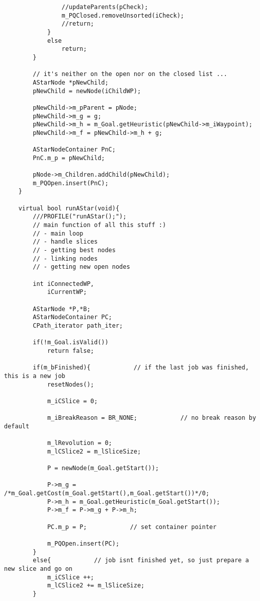\documentclass[12pt]{article}
\begin{document}
\begin{verbatim}
                //updateParents(pCheck);
                m_PQClosed.removeUnsorted(iCheck);
                //return;
            }
            else
                return;
        }
        
        // it's neither on the open nor on the closed list ...
        AStarNode *pNewChild;
        pNewChild = newNode(iChildWP);
        
        pNewChild->m_pParent = pNode;
        pNewChild->m_g = g;
        pNewChild->m_h = m_Goal.getHeuristic(pNewChild->m_iWaypoint);
        pNewChild->m_f = pNewChild->m_h + g;
        
        AStarNodeContainer PnC;
        PnC.m_p = pNewChild;
        
        pNode->m_Children.addChild(pNewChild);
        m_PQOpen.insert(PnC);
    }
    
    virtual bool runAStar(void){
        ///PROFILE("runAStar();");
        // main function of all this stuff :)
        // - main loop
        // - handle slices
        // - getting best nodes
        // - linking nodes
        // - getting new open nodes

        int iConnectedWP,
            iCurrentWP;

        AStarNode *P,*B;
        AStarNodeContainer PC;
        CPath_iterator path_iter;

        if(!m_Goal.isValid())
            return false;
        
        if(m_bFinished){            // if the last job was finished, this is a new job
            resetNodes();

            m_iCSlice = 0;
            
            m_iBreakReason = BR_NONE;            // no break reason by default
            
            m_lRevolution = 0;
            m_lCSlice2 = m_lSliceSize;
            
            P = newNode(m_Goal.getStart());
            
            P->m_g = /*m_Goal.getCost(m_Goal.getStart(),m_Goal.getStart())*/0;
            P->m_h = m_Goal.getHeuristic(m_Goal.getStart());
            P->m_f = P->m_g + P->m_h;

            PC.m_p = P;            // set container pointer
            
            m_PQOpen.insert(PC);
        }
        else{            // job isnt finished yet, so just prepare a new slice and go on 
            m_iCSlice ++;
            m_lCSlice2 += m_lSliceSize;
        }
        

\end{verbatim}
\end{document}

